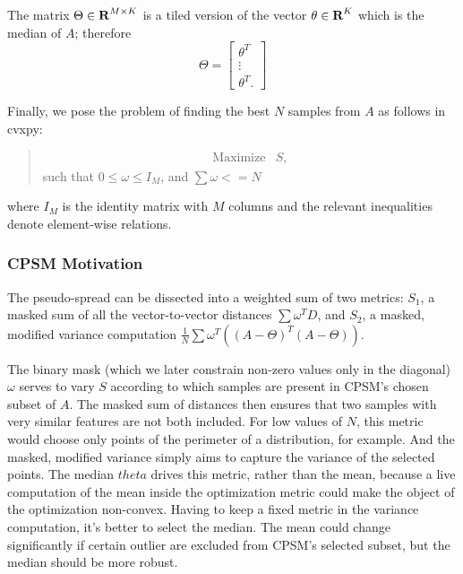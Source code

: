 \documentclass[10pt,twocolumn,letterpaper]{article}
\begin{document}
The matrix $\Theta \in {\mbox{\bf R}}^{M \times K}$ is a tiled version of the vector $\theta \in {\mbox{\bf R}}^{K}$ which is the median of $A$; therefore $$\Theta = \begin{bmatrix} \theta^T \\ \vdots \\ \theta^T.
\end{bmatrix}$$

Finally, we pose the problem of finding the best $N$ samples from $A$ as follows in cvxpy:
\begin{quote}
 
    \[
        \begin{array}{ll}
            \mbox{Maximize} & S,
        \end{array}
    \]
    such that $0 \leq \omega \leq I_M$, and $\sum \omega <= N$ 
\end{quote}
where $I_M$ is the identity matrix with $M$ columns and the relevant inequalities denote element-wise relations.

  

\subsubsection{CPSM Motivation}
The pseudo-spread can be dissected into a weighted sum of two metrics: $S_1$, a masked sum of all the vector-to-vector distances $\sum \omega^T D$, and $S_2$, a masked, modified variance computation $\frac{1}{N} \sum \omega^T \left((A-\Theta)^T(A-\Theta)\right)$. 

The binary mask (which we later constrain non-zero values only in the diagonal) $\omega$ serves to vary $S$ according to which samples are present in CPSM's chosen subset of $A$. The masked sum of distances then ensures that two samples with very similar features are not both included. For low values of $N$, this metric would choose only points of the perimeter of a distribution, for example. And the masked, modified variance simply aims to capture the variance of the selected points. The median $theta$ drives this metric, rather than the mean, because a live computation of the mean inside the optimization metric could make the object of the optimization non-convex. Having to keep a fixed metric in the variance computation, it's better to select the median. The mean could change significantly if certain outlier are excluded from CPSM's selected subset, but the median should be more robust.
\end{document}
